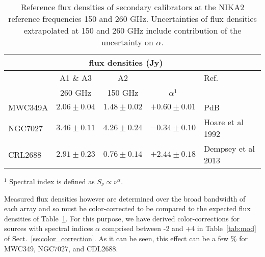 \begin{table}[h]
\begin{center}    
  \begin{threeparttable}

\begin{tabular}{|l|c|c|c|l|}
\hline
\multicolumn{1}{|c}{}  & \multicolumn{3}{|c}{flux  densities (Jy)} & \multicolumn{1}{|c|}{}  \\
\hline
         &    A1 \& A3       &  A2             &          &   Ref. \\
         &  260 GHz           &  150 GHz         & $\alpha^1$ &      \\
\hline
MWC349A   &   $2.06\pm0.04$  &  $1.48\pm0.02$ &  $+0.60\pm0.01$      &  PdB \cite{krips}    \\
NGC7027  &   $3.46\pm0.11$   &  $4.26\pm0.24$  &  $-0.34\pm0.10$     &  Hoare et al 1992 \cite{Hoare1992}      \\
CRL2688  &   $2.91\pm0.23$   &  $0.76\pm0.14$  &  $+2.44\pm0.18$     &  Dempsey et al 2013  \cite{Dempsey} \\
\hline
\end{tabular}
  \begin{tablenotes}
{\small     
  \item[$^1$]  Spectral index is defined as $S_{\nu} \propto \nu^{\alpha}$. 
}
  \end{tablenotes}
\end{threeparttable}
\caption[Reference flux densities of secondary calibrators]{Reference flux densities of secondary calibrators at the NIKA2 reference frequencies 150 and 260 GHz. Uncertainties of flux densities extrapolated
at 150 and 260 GHz include contribution of the uncertainty on $\alpha$.}
\label{tab:flux_ref_sec}
\end{center}
\end{table}


Measured flux densities however are determined over the broad
bandwidth of each array and so must be color-corrected to be compared
to the expected flux densities of Table~\ref{tab:flux_ref_sec}.  For
this purpose, we have derived color-corrections for sources with spectral
indices $\alpha$ comprised between -2 and +4 in Table~\ref{tab:mod} of
Sect.~\ref{se:color_correction}. %
As it can be seen, this effect can be a few \% for MWC349, NGC7027, and CDL2688.
